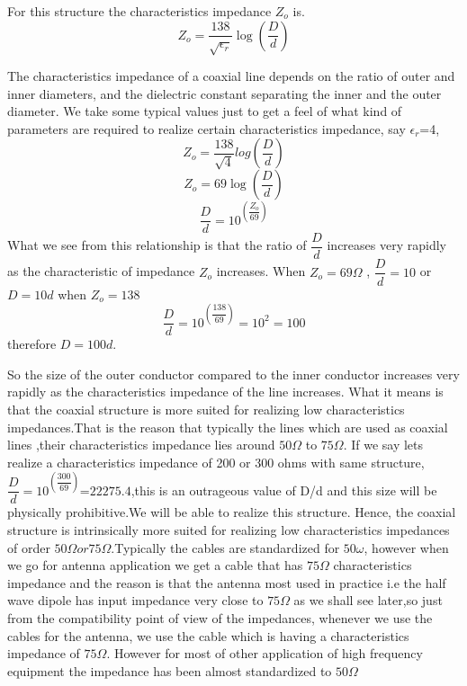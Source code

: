 For this structure the characteristics impedance $Z_o$ is.
\begin{equation*}
Z_o=\dfrac{138}{\sqrt{\epsilon_r}}\log(\dfrac{D}{d})
\end{equation*}

The characteristics impedance of a coaxial line depends on the ratio of outer and inner diameters, and the dielectric constant separating the inner and the outer diameter.
We take some typical values just to get a feel of what kind of parameters are required to realize certain characteristics impedance, say $\epsilon_r$=4, $$Z_o=\dfrac{138}{\sqrt{4}}log(\dfrac{D}{d})$$ $$Z_o=69\log(\dfrac{D}{d})$$ $$\dfrac{D}{d}=10^{(\dfrac{Z_o}{69})}$$
What we see from this relationship is that the ratio of $\dfrac{D}{d}$  increases very rapidly as the characteristic of impedance $Z_o$ increases. When $Z_o=69\varOmega$ , $\dfrac{D}{d}=10$ or  $D=10d$ when $Z_o = 138$
\begin{dmath*}
\dfrac{D}{d}=10^{(\dfrac{138}{69})}=10^{2}=100
\end{dmath*}
therefore $D=100d$.

So the size of the outer conductor compared to the inner conductor increases very rapidly as the characteristics impedance of the line increases. What it means is that the coaxial structure is more suited for realizing low characteristics impedances.That is the reason that typically the lines which are used as coaxial lines ,their characteristics impedance lies around $50\Omega$ to $75\Omega$. If we say lets realize a characteristics impedance of 200 or 300 ohms with same structure, $\dfrac{D}{d}=10^{(\dfrac{300}{69})}$=$22275.4$,this is an outrageous value of D/d and this size will be physically prohibitive.We will  be able to realize this structure. Hence, the coaxial structure is intrinsically more suited for realizing low characteristics impedances of order $50\Omega or 75\Omega$.Typically the cables are standardized for $50\omega$, however when we go for antenna application we get a cable that has $75\Omega$ characteristics impedance  and the reason is that the antenna most used in practice i.e the half wave dipole has input impedance very close to $75\Omega$ as we shall see later,so just from the compatibility point of view of the impedances, whenever we use the cables for the antenna, we use the cable which is having a characteristics impedance of $75\Omega$. However for most of other application of high frequency equipment the impedance has been almost standardized to $50\Omega$

